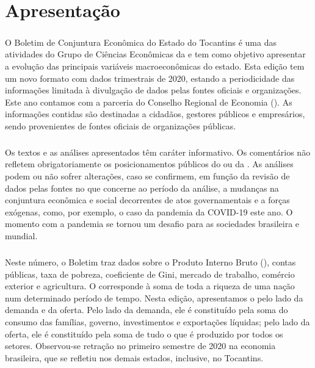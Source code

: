 \chapter*{Apresentação}
\begin{center}
	\begin{minipage}[t]{.7\linewidth}
		\paragraph{} O Boletim de Conjuntura Econômica do Estado do Tocantins é uma das atividades do Grupo  de Ciências Econômicas da  e tem como objetivo apresentar a evolução das principais variáveis macroeconômicas do estado. Esta edição tem um novo formato com dados trimestrais de 2020, estando a periodicidade das informações limitada à divulgação de dados pelas fontes oficiais e organizações. Este ano contamos com a parceria do Conselho Regional de Economia (). As informações contidas são destinadas a cidadãos, gestores públicos e empresários, sendo provenientes de fontes oficiais de organizações públicas.

		\paragraph{} Os textos e as análises apresentados têm caráter   informativo. Os comentários não refletem obrigatoriamente os posicionamentos públicos do  ou da . As análises podem ou não sofrer alterações, caso se confirmem, em função da revisão de dados pelas fontes no que concerne ao período da análise, a mudanças na conjuntura econômica e social decorrentes de atos governamentais e a forças exógenas, como, por exemplo, o caso da pandemia da COVID-19 este ano. O momento com a pandemia se tornou um desafio para as sociedades brasileira e mundial.

		\paragraph{} Neste número, o Boletim traz dados sobre o Produto Interno Bruto (), contas públicas, taxa de pobreza, coeficiente de Gini, mercado de trabalho, comércio exterior e agricultura. O  corresponde à soma de toda a riqueza de uma nação num determinado período de tempo. Nesta edição, apresentamos o  pelo lado da demanda e da oferta. Pelo lado da demanda, ele é constituído pela soma do consumo das famílias, governo, investimentos e exportações líquidas; pelo lado da oferta, ele é constituído pela soma de tudo o que é produzido por todos os setores. Observou-se retração no primeiro semestre de 2020 na economia brasileira, que se refletiu nos demais estados, inclusive, no Tocantins.


\end{minipage}
\end{center}
